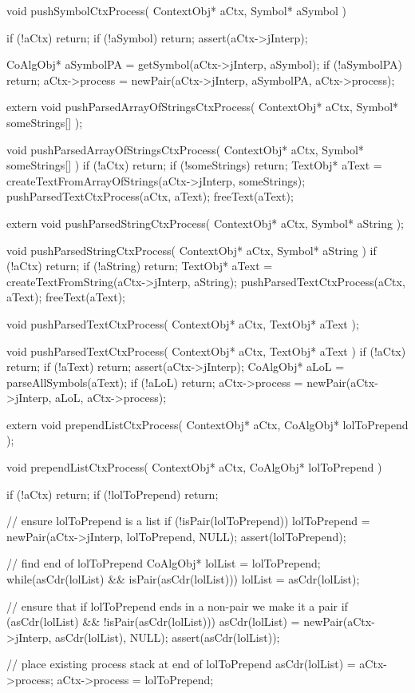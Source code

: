 \startCCode
void pushSymbolCtxProcess(
  ContextObj* aCtx,
  Symbol* aSymbol
) {
  if (!aCtx) return;
  if (!aSymbol) return;
  assert(aCtx->jInterp);

  CoAlgObj* aSymbolPA =
    getSymbol(aCtx->jInterp, aSymbol);
  if (!aSymbolPA) return;
  aCtx->process = newPair(aCtx->jInterp, aSymbolPA, aCtx->process);
}
\stopCCode

\startCHeader
extern void pushParsedArrayOfStringsCtxProcess(
  ContextObj* aCtx,
  Symbol* someStrings[]
);
\stopCHeader

\startCCode
void pushParsedArrayOfStringsCtxProcess(
  ContextObj* aCtx,
  Symbol* someStrings[]
) {
  if (!aCtx) return;
  if (!someStrings) return;
  TextObj* aText =
    createTextFromArrayOfStrings(aCtx->jInterp, someStrings);
  pushParsedTextCtxProcess(aCtx, aText);
  freeText(aText);
}
\stopCCode

\startCHeader
extern void pushParsedStringCtxProcess(
  ContextObj* aCtx,
  Symbol* aString
);
\stopCHeader

\startCCode
void pushParsedStringCtxProcess(
  ContextObj* aCtx,
  Symbol* aString
) {
  if (!aCtx) return;
  if (!aString) return;
  TextObj* aText =
    createTextFromString(aCtx->jInterp, aString);
  pushParsedTextCtxProcess(aCtx, aText);
  freeText(aText);
}
\stopCCode

\startCHeader
void pushParsedTextCtxProcess(
  ContextObj* aCtx,
  TextObj* aText
);
\stopCHeader

\startCCode
void pushParsedTextCtxProcess(
  ContextObj* aCtx,
  TextObj* aText
) {
  if (!aCtx) return;
  if (!aText) return;
  assert(aCtx->jInterp);
  CoAlgObj* aLoL = parseAllSymbols(aText);
  if (!aLoL) return;
  aCtx->process = newPair(aCtx->jInterp, aLoL, aCtx->process);
}
\stopCCode

\startCHeader
extern void prependListCtxProcess(
  ContextObj* aCtx,
  CoAlgObj* lolToPrepend
);
\stopCHeader

\startCCode
void prependListCtxProcess(
  ContextObj* aCtx,
  CoAlgObj* lolToPrepend
) {
  if (!aCtx) return;
  if (!lolToPrepend) return;

  // ensure lolToPrepend is a list
  if (!isPair(lolToPrepend)) {
    lolToPrepend = newPair(aCtx->jInterp, lolToPrepend, NULL);
    assert(lolToPrepend);
  }

  // find end of lolToPrepend
  CoAlgObj* lolList = lolToPrepend;
  while(asCdr(lolList) && isPair(asCdr(lolList))) {
    lolList = asCdr(lolList);
  }

  // ensure that if lolToPrepend ends in a non-pair we make it a pair
  if (asCdr(lolList) && !isPair(asCdr(lolList))) {
    asCdr(lolList) = newPair(aCtx->jInterp, asCdr(lolList), NULL);
    assert(asCdr(lolList));
  }

  // place existing process stack at end of lolToPrepend
  asCdr(lolList)  = aCtx->process;
  aCtx->process   = lolToPrepend;
}
\stopCCode

